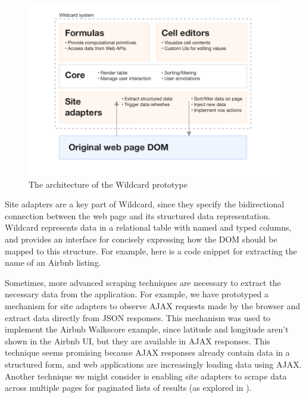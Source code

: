 \documentclass[english,submission]{programming}
\newenvironment{Shaded}{}{}
\newcommand{\CommentTok}[1]{\textcolor[rgb]{0.38,0.63,0.69}{\textit{#1}}}
\newcommand{\FunctionTok}[1]{\textcolor[rgb]{0.02,0.16,0.49}{#1}}
\newcommand{\KeywordTok}[1]{\textcolor[rgb]{0.00,0.44,0.13}{\textbf{#1}}}
\newcommand{\NormalTok}[1]{#1}
\newcommand{\OperatorTok}[1]{\textcolor[rgb]{0.40,0.40,0.40}{#1}}
\newcommand{\SpecialCharTok}[1]{\textcolor[rgb]{0.25,0.44,0.63}{#1}}
\newcommand{\StringTok}[1]{\textcolor[rgb]{0.25,0.44,0.63}{#1}}
\newcommand{\VariableTok}[1]{\textcolor[rgb]{0.10,0.09,0.49}{#1}}
\newcommand{\VerbatimStringTok}[1]{\textcolor[rgb]{0.25,0.44,0.63}{#1}}
\begin{document}
\begin{figure}
\hypertarget{fig:architecture}{%
\centering
\includegraphics{media/architecture-clean.png}
\caption{The architecture of the Wildcard
prototype}\label{fig:architecture}
}
\end{figure}

Site adapters are a key part of Wildcard, since they specify the
bidirectional connection between the web page and its structured data
representation. Wildcard represents data in a relational table with
named and typed columns, and provides an interface for concisely
expressing how the DOM should be mapped to this structure. For example,
here is a code snippet for extracting the name of an Airbnb listing.

\begin{Shaded}
\end{Shaded}

Sometimes, more advanced scraping techniques are necessary to extract
the necessary data from the application. For example, we have prototyped
a mechanism for site adapters to observe AJAX requests made by the
browser and extract data directly from JSON responses. This mechanism
was used to implement the Airbnb Walkscore example, since latitude and
longitude aren't shown in the Airbnb UI, but they are available in AJAX
responses. This technique seems promising because AJAX responses already
contain data in a structured form, and web applications are increasingly
loading data using AJAX. Another technique we might consider is enabling
site adapters to scrape data across multiple pages for paginated lists
of results (as explored in \autocite{huynh2006}).
\end{document}

